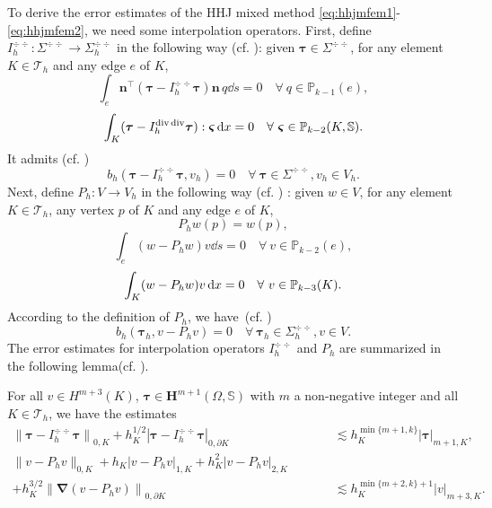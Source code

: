 To derive the error estimates of the HHJ mixed method \eqref{eq:hhjmfem1}-\eqref{eq:hhjmfem2},  we need some interpolation operators. First, define $I_h^{\div\div}: \Sigma^{\div\div}\to \Sigma_h^{\div\div}$ in the following way (cf. \cite{BabuvskaOsbornPitkaranta1980,FalkOsborn1980,Comodi1989,BoffiBrezziFortin2013}): given $\boldsymbol{\tau}\in\Sigma^{\div\div}$, for any element $K\in \mathcal{T}_h$ and any edge $e$ of $K$,
\[
\int_e\boldsymbol{n}^{\intercal}(\boldsymbol{\tau}-I_h^{\div\div}\boldsymbol{\tau})\boldsymbol{n}\,q\dd s=0 \quad \forall~q\in \mathbb P_{k-1}(e),
\]
\[
\int_K(\boldsymbol{\tau}-I_h^{\operatorname{div}\operatorname{div}}\boldsymbol{\tau}):\boldsymbol{\varsigma}\,{\rm d}x=0 \quad \forall~\boldsymbol{\varsigma}\in \mathbb{P}_{k-2}(K, \mathbb{S}).
\]
It admits (cf. \cite{BabuvskaOsbornPitkaranta1980,FalkOsborn1980,Comodi1989,BoffiBrezziFortin2013})
\begin{equation}\label{eq:bpi}
b_h(\boldsymbol{\tau}-I_h^{\div\div}\boldsymbol{\tau}, v_h)=0 \quad \forall~\boldsymbol{\tau}\in \Sigma^{\div\div}, v_h\in V_h.
\end{equation}
Next, define $P_h: V\to V_h$ in the following way (cf. \cite{BabuvskaOsbornPitkaranta1980,FalkOsborn1980,Comodi1989,Stenberg1991}) : given $w\in V$, for any element $K\in \mathcal{T}_h$, any vertex $p$ of $K$ and any edge $e$ of $K$,
\[
P_hw(p)=w(p),
\]
\[
\int_e(w-P_hw)v\dd s=0 \quad \forall~v\in \mathbb P_{k-2}(e),
\]
\[
\int_K(w-P_hw)v\,{\rm d}x=0 \quad \forall~v\in \mathbb P_{k-3}(K).
\]
According to the definition of $P_h$,
we have~(cf. \cite{BabuvskaOsbornPitkaranta1980,FalkOsborn1980,Comodi1989,BoffiBrezziFortin2013})
\begin{equation}\label{eq:bp0}
b_h(\boldsymbol{\tau}_h, v-P_hv)=0 \quad \forall~ \boldsymbol{\tau}_h\in \Sigma_h^{\div\div}, v\in V.
\end{equation}
The error estimates for interpolation operators $I_h^{\div\div}$ and $P_h$ are summarized in the following lemma(cf. \cite{BabuvskaOsbornPitkaranta1980,FalkOsborn1980,Comodi1989,Stenberg1991}).
\begin{lemma}\label{lem:hhjinterpolation}
For all $v\in H^{m+3}(K)$, $\boldsymbol{\tau}\in \boldsymbol{H}^{m+1}(\Omega, \mathbb{S})$ with $m$ a non-negative integer and
all $K\in\mathcal{T}_h$, we have the estimates
\begin{align*}
\left\|\boldsymbol{\tau}-I_h^{\div\div}\boldsymbol{\tau}\right\|_{0,K}+h_K^{1/2}\left|\boldsymbol{\tau}-I_h^{\div\div}\boldsymbol{\tau}\right|_{0,\partial K} &\lesssim
h_K^{\min\{m+1,k\}}|\boldsymbol{\tau}|_{m+1,K}, \\
\|v-P_hv\|_{0,K}+h_K\left|v-P_hv\right|_{1,K}+h_K^2\left|v-P_hv\right|_{2,K}\qquad\;\;\;&
 \\
 +h_K^{3/2}\left\|\boldsymbol{\nabla}(v-P_hv)\right\|_{0,\partial K} &\lesssim
h^{\min\{m+2,k\}+1}_K|v|_{m+3,K}.
\end{align*}
\end{lemma}

